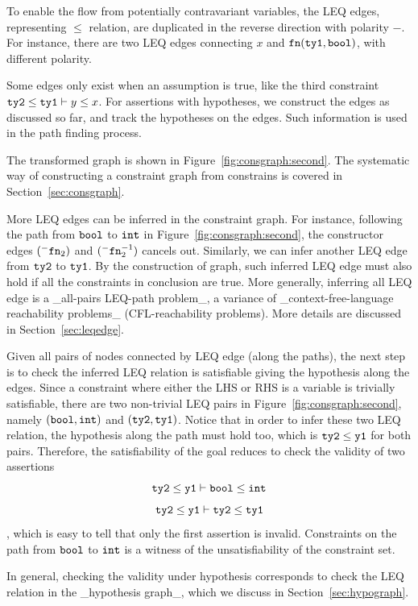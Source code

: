 To enable the flow from potentially contravariant variables, the LEQ edges,
representing $\leq$ relation, are duplicated in the reverse direction with
polarity $-$. For instance, there are two LEQ edges connecting $x$ and
$\mathtt{fn}(\mathtt{ty1},\mathtt{bool})$, with different polarity.

Some edges only exist when an assumption is true, like the third constraint
$\mathtt{ty2} \leq \mathtt{ty1} \vdash y \leq x$. For assertions with hypotheses, we
construct the edges as discussed so far, and track the hypotheses on the edges.
Such information is used in the path finding process.

The transformed graph is shown in Figure~\ref{fig:consgraph:second}. The
systematic way of constructing a constraint graph from constrains is covered in
Section~\ref{sec:consgraph}.

More LEQ edges can be inferred in the constraint graph. For instance, following
the path from $\mathtt{bool}$ to $\mathtt{int}$ in Figure~\ref{fig:consgraph:second},
the constructor edges $(^{-}\mathtt{fn}_2)$ and
$(^{-}\mathtt{fn}_2^{-1})$ cancels out. Similarly, we can infer another
LEQ edge from  $\mathtt{ty2}$ to $\mathtt{ty1}$. By the construction of graph, such
inferred LEQ edge must also hold if all the constraints in conclusion are true.
More generally, inferring all LEQ edge is a _all-pairs LEQ-path problem_, a
variance of _context-free-language reachability problems_ (CFL-reachability
problems). More details are discussed in Section~\ref{sec:leqedge}.

Given all pairs of nodes connected by LEQ edge (along the paths), the next step
is to check the inferred LEQ relation is satisfiable giving the hypothesis
along the edges. Since a constraint where either the LHS or RHS is a variable
is trivially satisfiable, there are two non-trivial LEQ pairs in
Figure~\ref{fig:consgraph:second}, namely $(\mathtt{bool, int})$ and $(\mathtt{ty2,
ty1})$. Notice that in order to infer these two LEQ relation, the hypothesis
along the path must hold too, which is $\mathtt{ty2}\leq \mathtt{y1}$ for both pairs.
Therefore, the satisfiability of the goal reduces to check the validity of two
assertions 
%
\[\mathtt{ty2}\leq \mathtt{y1}\vdash \mathtt{bool}\leq \mathtt{int}\]
\[\mathtt{ty2}\leq \mathtt{y1}\vdash \mathtt{ty2}\leq \mathtt{ty1}\]
, which is easy to tell that only the first assertion is invalid. Constraints
on the path from $\mathtt{bool}$ to $\mathtt{int}$ is a witness of the
unsatisfiability of the constraint set.

In general, checking the validity under hypothesis corresponds to check the LEQ
relation in the _hypothesis graph_, which we discuss in
Section~\ref{sec:hypograph}.


